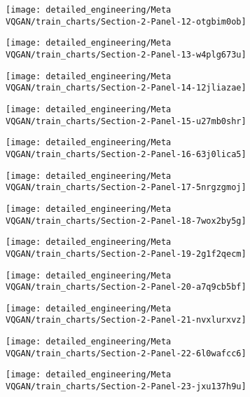 \begin{figure}[H]
\texttt{[image: detailed\_engineering/Meta VQGAN/train\_charts/Section-2-Panel-12-otgbim0ob]}
\caption{}
\endminipage\hfill
{}
\texttt{[image: detailed\_engineering/Meta VQGAN/train\_charts/Section-2-Panel-13-w4plg673u]}
\caption{}
\endminipage
\end{figure}

\begin{figure}[H]
\texttt{[image: detailed\_engineering/Meta VQGAN/train\_charts/Section-2-Panel-14-12jliazae]}
\caption{}
\endminipage\hfill
{}
\texttt{[image: detailed\_engineering/Meta VQGAN/train\_charts/Section-2-Panel-15-u27mb0shr]}
\caption{}
\endminipage
\end{figure}

\begin{figure}[H]
\texttt{[image: detailed\_engineering/Meta VQGAN/train\_charts/Section-2-Panel-16-63j0lica5]}
\caption{}
\endminipage\hfill
{}
\texttt{[image: detailed\_engineering/Meta VQGAN/train\_charts/Section-2-Panel-17-5nrgzgmoj]}
\caption{}
\endminipage
\end{figure}

\begin{figure}[H]
\texttt{[image: detailed\_engineering/Meta VQGAN/train\_charts/Section-2-Panel-18-7wox2by5g]}
\caption{}
\endminipage\hfill
{}
\texttt{[image: detailed\_engineering/Meta VQGAN/train\_charts/Section-2-Panel-19-2g1f2qecm]}
\caption{}
\endminipage
\end{figure}

\begin{figure}[H]
\texttt{[image: detailed\_engineering/Meta VQGAN/train\_charts/Section-2-Panel-20-a7q9cb5bf]}
\caption{}
\endminipage\hfill
{}
\texttt{[image: detailed\_engineering/Meta VQGAN/train\_charts/Section-2-Panel-21-nvxlurxvz]}
\caption{}
\endminipage
\end{figure}

\begin{figure}[H]
\texttt{[image: detailed\_engineering/Meta VQGAN/train\_charts/Section-2-Panel-22-6l0wafcc6]}
\caption{}
\endminipage\hfill
{}
\texttt{[image: detailed\_engineering/Meta VQGAN/train\_charts/Section-2-Panel-23-jxu137h9u]}
\caption{}
\endminipage
\end{figure}

